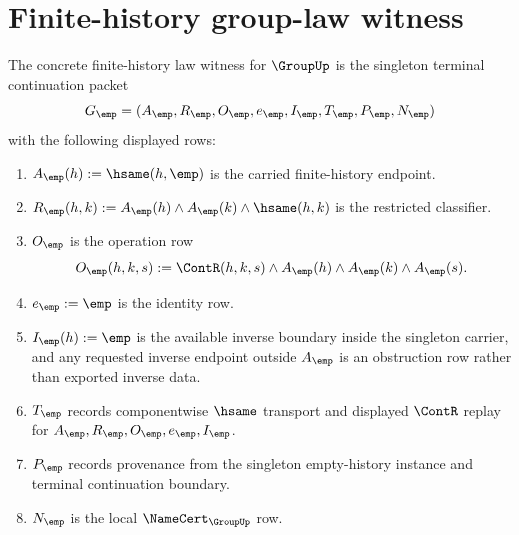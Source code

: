 \section{Finite-history group-law witness}
\label{sec:group-finite-history-law-witness}

\begin{definition}
\label{def:group-finite-history-law-witness}
The concrete finite-history law witness for $\GroupUp$ is the singleton
terminal continuation packet
$$
G_{\emp}=(A_{\emp},R_{\emp},O_{\emp},e_{\emp},I_{\emp},T_{\emp},P_{\emp},N_{\emp})
$$
with the following displayed rows:
\begin{enumerate}
\item $A_{\emp}(h):=\hsame(h,\emp)$ is the carried finite-history endpoint.
\item $R_{\emp}(h,k):=A_{\emp}(h)\land A_{\emp}(k)\land \hsame(h,k)$ is the
restricted classifier.
\item $O_{\emp}$ is the operation row
$$
O_{\emp}(h,k,s):=\ContR(h,k,s)\land A_{\emp}(h)\land A_{\emp}(k)\land A_{\emp}(s).
$$
\item $e_{\emp}:=\emp$ is the identity row.
\item $I_{\emp}(h):=\emp$ is the available inverse boundary inside the
singleton carrier, and any requested inverse endpoint outside $A_{\emp}$ is an
obstruction row rather than exported inverse data.
\item $T_{\emp}$ records componentwise $\hsame$ transport and displayed
$\ContR$ replay for $A_{\emp},R_{\emp},O_{\emp},e_{\emp},I_{\emp}$.
\item $P_{\emp}$ records provenance from the singleton empty-history instance
and terminal continuation boundary.
\item $N_{\emp}$ is the local $\NameCert_{\GroupUp}$ row.
\end{enumerate}
\end{definition}

